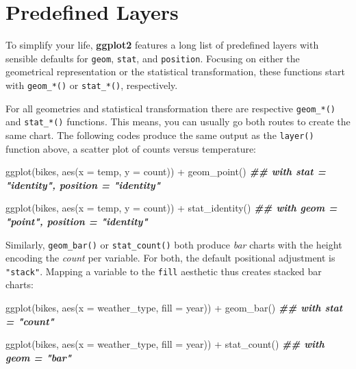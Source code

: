 \documentclass[
]{krantz}
\makeatletter
\newenvironment{Shaded}{\begin{snugshade}}{\end{snugshade}}
\newcommand{\AttributeTok}[1]{\textcolor[rgb]{0.61,0.61,0.61}{#1}}
\newcommand{\DocumentationTok}[1]{\textcolor[rgb]{0.37,0.37,0.37}{\textbf{\textit{#1}}}}
\newcommand{\FunctionTok}[1]{\textcolor[rgb]{0,0,0}{#1}}
\newcommand{\NormalTok}[1]{#1}
\newcommand{\SpecialCharTok}[1]{\textcolor[rgb]{0,0,0}{#1}}
\newenvironment{kframe}{%
\medskip{}
\setlength{\fboxsep}{.8em}
 \def\at@end@of@kframe{}%
 \ifinner\ifhmode%
  \def\at@end@of@kframe{\end{minipage}}%
  \begin{minipage}{\columnwidth}%
 \fi\fi%
 \def\FrameCommand##1{\hskip\@totalleftmargin \hskip-\fboxsep
 \colorbox{shadecolor}{##1}\hskip-\fboxsep
     \hskip-\linewidth \hskip-\@totalleftmargin \hskip\columnwidth}%
 \MakeFramed {\advance\hsize-\width
   \@totalleftmargin\z@ \linewidth\hsize
   \@setminipage}}%
 {\par\unskip\endMakeFramed%
 \at@end@of@kframe}
\renewenvironment{Shaded}{\begin{kframe}}{\end{kframe}}
\makeatother
\begin{document}
\hypertarget{predefined-layers}{%
\section{Predefined Layers}\label{predefined-layers}}

To simplify your life, \textbf{ggplot2} features a long list of predefined layers with sensible defaults for \texttt{geom}, \texttt{stat}, and \texttt{position}. Focusing on either the geometrical representation or the statistical transformation, these functions start with \texttt{geom\_*()} or \texttt{stat\_*()}, respectively.

For all geometries and statistical transformation there are respective \texttt{geom\_*()} and \texttt{stat\_*()} functions. This means, you can usually go both routes to create the same chart. The following codes produce the same output as the \texttt{layer()} function above, a scatter plot of counts versus temperature:

\begin{Shaded}
\begin{Highlighting}[]
\FunctionTok{ggplot}\NormalTok{(bikes, }\FunctionTok{aes}\NormalTok{(}\AttributeTok{x =}\NormalTok{ temp, }\AttributeTok{y =}\NormalTok{ count)) }\SpecialCharTok{+}
  \FunctionTok{geom\_point}\NormalTok{() }\DocumentationTok{\#\# with \textasciigrave{}stat = "identity", position = "identity"\textasciigrave{}}

\FunctionTok{ggplot}\NormalTok{(bikes, }\FunctionTok{aes}\NormalTok{(}\AttributeTok{x =}\NormalTok{ temp, }\AttributeTok{y =}\NormalTok{ count)) }\SpecialCharTok{+}
  \FunctionTok{stat\_identity}\NormalTok{() }\DocumentationTok{\#\# with \textasciigrave{}geom = "point", position = "identity"\textasciigrave{}}
\end{Highlighting}
\end{Shaded}

Similarly, \texttt{geom\_bar()} or \texttt{stat\_count()} both produce \emph{bar} charts with the height encoding the \emph{count} per variable. For both, the default positional adjustment is \texttt{"stack"}. Mapping a variable to the \texttt{fill} aesthetic thus creates stacked bar charts:

\begin{Shaded}
\begin{Highlighting}[]
\FunctionTok{ggplot}\NormalTok{(bikes, }\FunctionTok{aes}\NormalTok{(}\AttributeTok{x =}\NormalTok{ weather\_type, }\AttributeTok{fill =}\NormalTok{ year)) }\SpecialCharTok{+} 
  \FunctionTok{geom\_bar}\NormalTok{() }\DocumentationTok{\#\# with \textasciigrave{}stat = "count"\textasciigrave{}}

\FunctionTok{ggplot}\NormalTok{(bikes, }\FunctionTok{aes}\NormalTok{(}\AttributeTok{x =}\NormalTok{ weather\_type, }\AttributeTok{fill =}\NormalTok{ year)) }\SpecialCharTok{+} 
  \FunctionTok{stat\_count}\NormalTok{() }\DocumentationTok{\#\# with \textasciigrave{}geom = "bar"\textasciigrave{}}
\end{Highlighting}
\end{Shaded}
\end{document}

